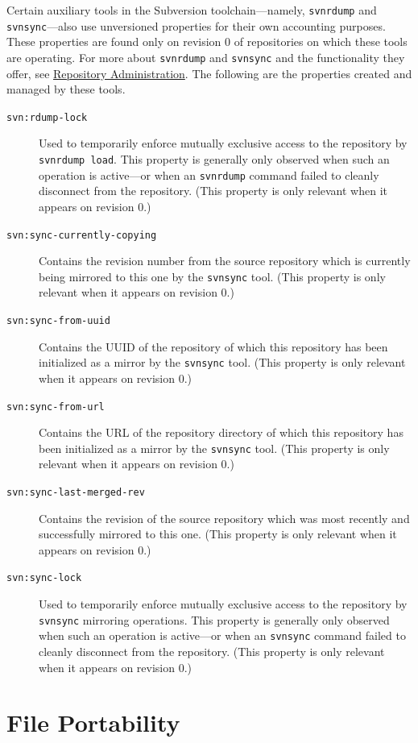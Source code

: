 Certain auxiliary tools in the Subversion toolchain---namely,
\texttt{svnrdump} and \texttt{svnsync}---also use unversioned properties
for their own accounting purposes. These properties are found only on
revision 0 of repositories on which these tools are operating. For more
about \texttt{svnrdump} and \texttt{svnsync} and the functionality they
offer, see \hyperref[svn.reposadmin]{Repository Administration}. The
following are the properties created and managed by these tools.

\begin{description}
\item[\texttt{svn:rdump-lock}]
Used to temporarily enforce mutually exclusive access to the repository
by \texttt{svnrdump\ load}. This property is generally only observed
when such an operation is active---or when an \texttt{svnrdump} command
failed to cleanly disconnect from the repository. (This property is only
relevant when it appears on revision 0.)
\item[\texttt{svn:sync-currently-copying}]
Contains the revision number from the source repository which is
currently being mirrored to this one by the \texttt{svnsync} tool. (This
property is only relevant when it appears on revision 0.)
\item[\texttt{svn:sync-from-uuid}]
Contains the UUID of the repository of which this repository has been
initialized as a mirror by the \texttt{svnsync} tool. (This property is
only relevant when it appears on revision 0.)
\item[\texttt{svn:sync-from-url}]
Contains the URL of the repository directory of which this repository
has been initialized as a mirror by the \texttt{svnsync} tool. (This
property is only relevant when it appears on revision 0.)
\item[\texttt{svn:sync-last-merged-rev}]
Contains the revision of the source repository which was most recently
and successfully mirrored to this one. (This property is only relevant
when it appears on revision 0.)
\item[\texttt{svn:sync-lock}]
Used to temporarily enforce mutually exclusive access to the repository
by \texttt{svnsync} mirroring operations. This property is generally
only observed when such an operation is active---or when an
\texttt{svnsync} command failed to cleanly disconnect from the
repository. (This property is only relevant when it appears on revision
0.)
\end{description}

\section{File Portability}\label{svn.advanced.props.file-portability}

